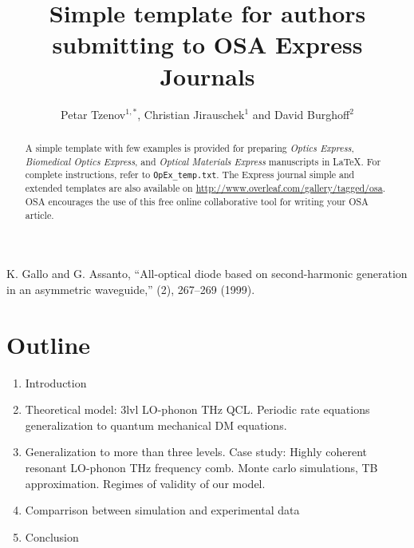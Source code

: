 \documentclass[10pt,letterpaper]{article}
\begin{document}
\title{Simple template for authors submitting to OSA Express Journals}

\author{Petar Tzenov$^{1,*}$, Christian Jirauschek$^1$ and David Burghoff$^{2}$}

\address{$^1$ Institute for Nanoelectronics, Technische Universit\''at M\''unchen, D-80333 Munich, Germany}
\address{$^2$ Somewhere in MIT, US}




\begin{abstract}
A simple template with few examples is provided for preparing \textit{Optics Express}, \textit{Biomedical Optics Express}, and \textit{Optical Materials Express} manuscripts in \LaTeX. For complete instructions, refer to \texttt{OpEx\_temp.txt}. The Express journal simple and extended templates are also available on \url{http://www.overleaf.com/gallery/tagged/osa}. OSA encourages the use of this free online collaborative tool for writing your OSA article.
\end{abstract}


\begin{thebibliography}{99}

 K. Gallo and G. Assanto, ``All-optical diode based on second-harmonic generation in an asymmetric waveguide,'' (2), 267--269 (1999).
\end{thebibliography}

\section{Outline}

\begin{enumerate}
	\item{Introduction} 
	\item{Theoretical model: 3lvl LO-phonon THz QCL. Periodic rate equations  generalization to quantum mechanical DM equations.}
	\item{Generalization to more than three levels. Case study: Highly coherent resonant LO-phonon THz frequency comb. Monte carlo simulations, TB approximation. Regimes of validity of our model. } 
	\item{Comparrison between simulation and experimental data}
	\item{Conclusion}
\end{enumerate}
\end{document}
